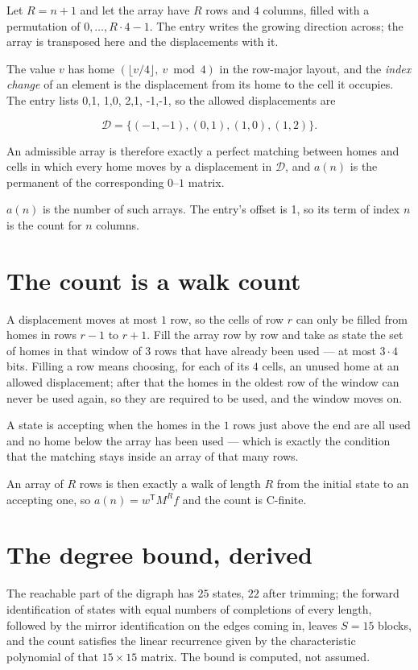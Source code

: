 \documentclass[11pt]{article}
\theoremstyle{definition}
\begin{document}
Let $R = n + 1$ and let the array have $R$ rows and $4$ columns, filled with a permutation of $0,\dots,R\cdot4-1$. The entry writes the growing direction across; the array is transposed here and the displacements with it.

The value $v$ has home $(\lfloor v/4\rfloor,\ v \bmod 4)$ in the row-major layout, and the {\itshape index change} of an element is the displacement from its home to the cell it occupies. The entry lists 0,1, 1,0, 2,1, -1,-1, so the allowed displacements are

\[\mathcal{D} = \{(-1,-1), (0,1), (1,0), (1,2)\}.\]

An admissible array is therefore exactly a perfect matching between homes and cells in which every home moves by a displacement in $\mathcal{D}$, and $a(n)$ is the permanent of the corresponding $0$--$1$ matrix.

$a(n)$ is the number of such arrays. The entry's offset is 1, so its term of index $n$ is the count for $n$ columns.

\section{The count is a walk count}

A displacement moves at most $1$ row, so the cells of row $r$ can only be filled from homes in rows $r-1$ to $r+1$. Fill the array row by row and take as state the set of homes in that window of $3$ rows that have already been used --- at most $3\cdot4$ bits. Filling a row means choosing, for each of its $4$ cells, an unused home at an allowed displacement; after that the homes in the oldest row of the window can never be used again, so they are required to be used, and the window moves on.

A state is accepting when the homes in the $1$ rows just above the end are all used and no home below the array has been used --- which is exactly the condition that the matching stays inside an array of that many rows.

An array of $R$ rows is then exactly a walk of length $R$ from the initial state to an accepting one, so $a(n) = w^{\mathsf T}M^{R}f$ and the count is C-finite.

\section{The degree bound, derived}

The reachable part of the digraph has $25$ states, $22$ after trimming; the forward identification of states with equal numbers of completions of every length, followed by the mirror identification on the edges coming in, leaves $S = 15$ blocks, and the count satisfies the linear recurrence given by the characteristic polynomial of that $15\times15$ matrix. The bound is computed, not assumed.
\end{document}
